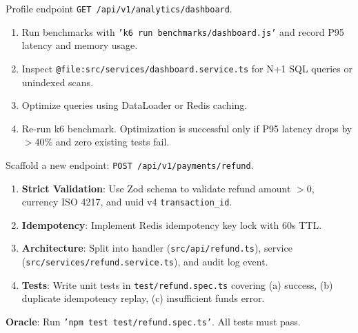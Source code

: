 \documentclass[11pt,a4paper,oneside]{book}
\begin{document}
\begin{promptbox}
Profile endpoint \texttt{GET /api/v1/analytics/dashboard}.
\begin{enumerate}
    \item Run benchmarks with \texttt{'k6 run benchmarks/dashboard.js'} and record P95 latency and memory usage.
    \item Inspect \texttt{@file:src/services/dashboard.service.ts} for N+1 SQL queries or unindexed scans.
    \item Optimize queries using DataLoader or Redis caching.
    \item Re-run k6 benchmark. Optimization is successful only if P95 latency drops by $>40\%$ and zero existing tests fail.
\end{enumerate}
\end{promptbox}

\begin{promptbox}
Scaffold a new endpoint: \texttt{POST /api/v1/payments/refund}.
\begin{enumerate}
    \item \textbf{Strict Validation}: Use Zod schema to validate refund amount $>0$, currency ISO 4217, and uuid v4 \texttt{transaction\_id}.
    \item \textbf{Idempotency}: Implement Redis idempotency key lock with 60s TTL.
    \item \textbf{Architecture}: Split into handler (\texttt{src/api/refund.ts}), service (\texttt{src/services/refund.service.ts}), and audit log event.
    \item \textbf{Tests}: Write unit tests in \texttt{test/refund.spec.ts} covering (a) success, (b) duplicate idempotency replay, (c) insufficient funds error.
\end{enumerate}
\textbf{Oracle}: Run \texttt{'npm test test/refund.spec.ts'}. All tests must pass.
\end{promptbox}
\end{document}

